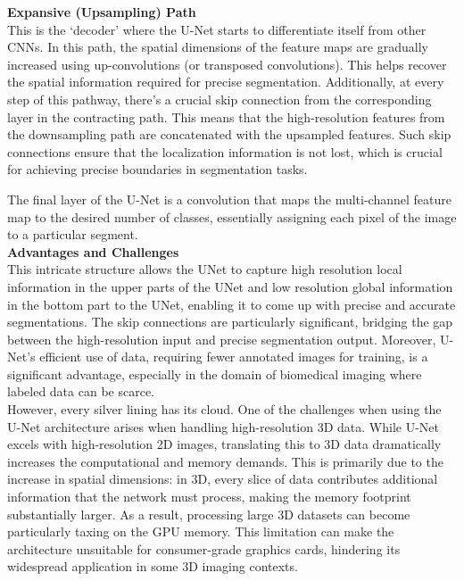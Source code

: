 \noindent\textbf{Expansive (Upsampling) Path}\\
This is the `decoder' where the U-Net starts to differentiate itself from other CNNs.
In this path, the spatial dimensions of the feature maps are gradually increased using up-convolutions
(or transposed convolutions). This helps recover the spatial information required for precise segmentation.
Additionally, at every step of this pathway, there's a crucial skip connection from the corresponding layer in the contracting path.
This means that the high-resolution features from the downsampling path are concatenated with the upsampled features.
Such skip connections ensure that the localization information is not lost,
which is crucial for achieving precise boundaries in segmentation tasks.\cite[4]{ronneberger_u-net_2015}

\noindent The final layer of the U-Net is a convolution that maps the multi-channel feature map to the desired number of classes, essentially assigning each pixel of the image to a particular segment.\\

\noindent\textbf{Advantages and Challenges}\\
This intricate structure allows the UNet to capture high resolution local information in the upper parts of the UNet and low resolution global information in the bottom part to the UNet,
enabling it to come up with precise and accurate segmentations. The skip connections are particularly significant, bridging the gap between the high-resolution input and precise segmentation output.
Moreover, U-Net's efficient use of data, requiring fewer annotated images for training, is a significant advantage, especially in the domain of biomedical imaging where labeled data can be scarce.\\
However, every silver lining has its cloud. One of the challenges when using the U-Net architecture arises when handling high-resolution 3D data. While U-Net excels with high-resolution 2D images,
translating this to 3D data dramatically increases the computational and memory demands. This is primarily due to the increase in spatial dimensions: in 3D,
every slice of data contributes additional information that the network must process, making the memory footprint substantially larger. As a result,
processing large 3D datasets can become particularly taxing on the GPU memory. This limitation can make the architecture unsuitable for consumer-grade graphics cards,
hindering its widespread application in some 3D imaging contexts.
\newpage
